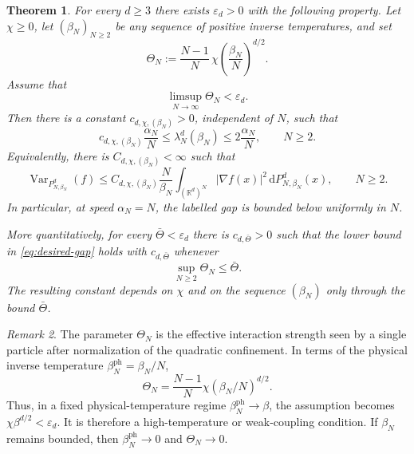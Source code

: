 \documentclass[12pt,reqno,letterpaper]{amsart}
\newtheorem{theorem}{Theorem}[section]
\theoremstyle{definition}
\theoremstyle{remark}
\newtheorem{remark}[theorem]{Remark}
\numberwithin{equation}{section}
\newcommand{\R}{\mathbb R}
\newcommand{\dd}{\,\mathrm d}
\newcommand{\be}{\beta}
\newcommand{\al}{\alpha}
\newcommand{\Var}{\operatorname{Var}}
\begin{document}
\begin{theorem}\label{thm:main}
For every \(d\ge3\) there exists \(\varepsilon_d>0\) with the following
property.  Let \(\chi\ge0\), let \((\be_N)_{N\ge2}\) be any sequence of
positive inverse temperatures, and set
\begin{equation}\label{eq:thetaN-definition}
 \Theta_N:=\frac{N-1}{N}\,\chi
 \left(\frac{\be_N}{N}\right)^{d/2}.
\end{equation}
Assume that
\begin{equation}\label{eq:thetaN-assumption}
 \limsup_{N\to\infty}\Theta_N<\varepsilon_d.
\end{equation}
Then there is a constant \(c_{d,\chi,(\be_N)}>0\), independent of \(N\),
such that
\begin{equation}\label{eq:desired-gap}
 c_{d,\chi,(\be_N)}\frac{\al_N}{N}
 \le \lambda_N^{d}(\be_N)
 \le 2\frac{\al_N}{N},
 \qquad N\ge2.
\end{equation}
Equivalently, there is \(C_{d,\chi,(\be_N)}<\infty\) such that
\begin{equation*}
 \Var_{P_{N,\be_N}^{d}}(f)
 \le C_{d,\chi,(\be_N)}\frac{N}{\be_N}
 \int_{(\R^d)^N}|\nabla f(x)|^2\dd P_{N,\be_N}^{d}(x),
 \qquad N\ge2.
\end{equation*}
In particular, at speed \(\al_N=N\), the labelled gap is bounded below
uniformly in \(N\).

More quantitatively, for every \(\bar\Theta<\varepsilon_d\) there is
\(c_{d,\bar\Theta}>0\) such that the lower bound in
\eqref{eq:desired-gap} holds with \(c_{d,\bar\Theta}\) whenever
\begin{equation*}
 \sup_{N\ge2}\Theta_N\le\bar\Theta.
\end{equation*}
The resulting constant depends on \(\chi\) and on the sequence
\((\be_N)\) only through the bound \(\bar\Theta\).
\end{theorem}

\begin{remark}
The parameter \(\Theta_N\) is the effective interaction strength seen by
a single particle after normalization of the quadratic confinement. In
terms of the physical inverse temperature
\(\beta_N^{\mathrm{ph}}=\be_N/N\),
\[ \Theta_N = \frac{N-1}{N}\chi
 \left(\beta_N/N \right)^{d/2}.
\]
Thus, in a fixed physical-temperature regime
\(\beta_N^{\mathrm{ph}} \to\beta\), the assumption becomes \(
 \chi\beta^{d/2}<\varepsilon_d\). 
It is therefore a high-temperature or weak-coupling condition. If
\(\be_N\) remains bounded, then
\(\beta_N^{\mathrm{ph}} \to 0\) and \(\Theta_N\to0\). 
\end{remark}
\end{document}
